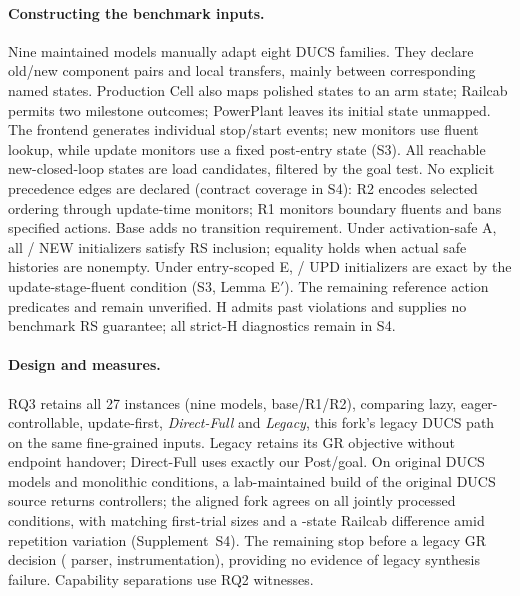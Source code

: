 \documentclass[acmsmall,screen,review,anonymous]{acmart}
\begin{document}
\paragraph{Constructing the benchmark inputs.}
Nine maintained models manually adapt eight DUCS families. They declare old/new component pairs and local transfers, mainly between corresponding named states. Production Cell also maps polished states to an arm state; Railcab permits two milestone outcomes; PowerPlant leaves its initial state unmapped. The frontend generates individual stop/start events; new monitors use fluent lookup, while update monitors use a fixed post-entry state (S3). All reachable new-closed-loop states are load candidates, filtered by the goal test. No explicit precedence edges are declared (contract coverage in S4): R2 encodes selected ordering through update-time monitors; R1 monitors boundary fluents and bans specified actions. Base adds no transition requirement. Under activation-safe A, all \RSAExactNew/\RSNewOccurrences{} NEW initializers satisfy RS inclusion; equality holds when actual safe histories are nonempty. Under entry-scoped E, \RSEExactUpd/\RSUpdOccurrences{} UPD initializers are exact by the update-stage-fluent condition (S3, Lemma E$'$). The remaining \RSEUnverifiedUpd{} reference action predicates and remain unverified. H admits past violations and supplies no benchmark RS guarantee; all strict-H diagnostics remain in S4.

\paragraph{Design and measures.}
RQ3 retains all 27 instances (nine models, base/R1/R2), comparing lazy, eager-controllable, update-first, \emph{Direct-Full} and \emph{Legacy}, this fork's legacy DUCS path on the same fine-grained inputs. Legacy retains its GR objective without endpoint handover; Direct-Full uses exactly our Post/goal. On \LFFamilies{} original DUCS models and \LFConditions{} monolithic conditions, a lab-maintained build of the original DUCS source returns \LFPublishedWins{} controllers; the aligned fork agrees on all \LFForkWins{} jointly processed conditions, with \LFSizeMatches{} matching first-trial sizes and a \LFRailcabStateDelta{}-state Railcab difference amid repetition variation (Supplement~S4). The remaining \LFUnmeasured{} stop before a legacy GR decision (\LFParserNM{} parser, \LFInstrumentationNM{} instrumentation), providing no evidence of legacy synthesis failure. Capability separations use RQ2 witnesses.
\end{document}
